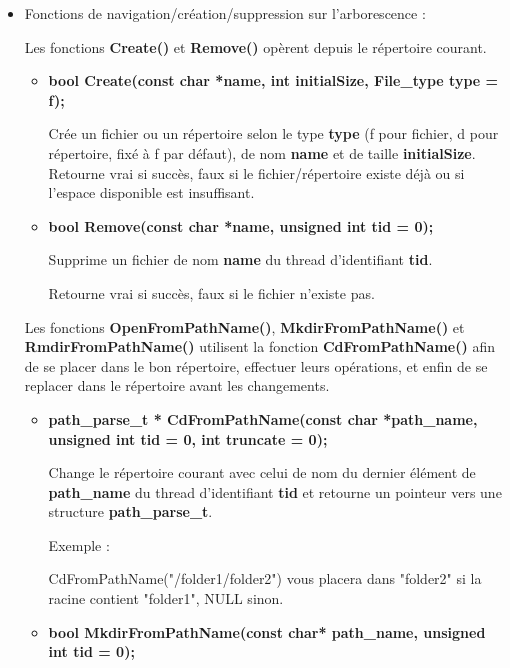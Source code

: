 \documentclass{article}
\begin{document}
\begin{itemize}

\item 
Fonctions de navigation/création/suppression sur l'arborescence :

Les fonctions \textbf{Create()} et \textbf{Remove()} opèrent depuis le répertoire courant.

\begin{itemize}

  \item  
  \textbf{bool Create(const char *name, int initialSize, File\_type type = f);}
  
  Crée un fichier ou un répertoire selon le type \textbf{type} (f pour fichier, d pour répertoire, fixé à f par défaut), de nom \textbf{name} et de taille \textbf{initialSize}. 
  Retourne vrai si succès, faux si le fichier/répertoire existe déjà ou si l'espace disponible est insuffisant.
  
    \item 
    \textbf{ bool Remove(const char *name, unsigned int tid = 0);}
    
    Supprime un fichier de nom \textbf{name} du thread d'identifiant \textbf{tid}.
    
    Retourne vrai si succès, faux si le fichier n'existe pas.

\end{itemize}
     
Les fonctions \textbf{OpenFromPathName()},  \textbf{MkdirFromPathName()} et  \textbf{RmdirFromPathName()} utilisent la fonction  \textbf{CdFromPathName()} afin de se placer dans le bon répertoire, effectuer leurs opérations, et enfin de se replacer dans le répertoire avant les changements.

     \begin{itemize}
     
     \item
      \textbf{path\_parse\_t * CdFromPathName(const char *path\_name, unsigned int tid = 0, int truncate = 0);}
     
     Change le répertoire courant avec celui de nom du dernier élément de \textbf{path\_name} du thread d'identifiant \textbf{tid} et retourne un pointeur vers une structure  \textbf{path\_parse\_t}. 
     
     Exemple : 
     
     CdFromPathName("/folder1/folder2") vous placera dans "folder2" si la racine contient "folder1", NULL sinon.

     \item  
     \textbf{bool MkdirFromPathName(const char* path\_name, unsigned int tid = 0);}
  

\end{itemize}
\end{itemize}
\end{document}
